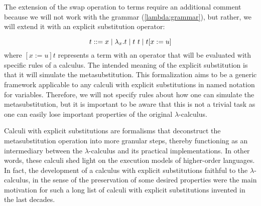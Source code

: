  The extension of the swap operation to terms require an additional comment because we will not work with the grammar (\ref{lambda:grammar}), but rather, we will extend it with an explicit substitution operator:


\begin{equation}\label{es:grammar}
  t ::= x \mid \lambda_x.t \mid t\ t \mid t [ x := u ]
\end{equation}
\noindent where $[x := u] t$ represents a term with an operator that will be evaluated with specific rules of a calculus. The intended meaning of the explicit substitution is that it will simulate the metasubstitution. This formalization aims to be a generic framework applicable to any calculi with explicit substitutions in named notation for variables. Therefore, we will not specify rules about how one can simulate the metasubstitution, but it is important to be aware that this is not a trivial task as one can easily lose important properties of the original $\lambda$-calculus\cite{melliesTypedLcalculiExplicit1995,guillaumeLambdaCalculusDoes2000}.


Calculi with explicit substitutions are formalisms that deconstruct the metasubstitution operation into more granular steps, thereby functioning as an intermediary between the $\lambda$-calculus and its practical implementations. In other words, these calculi shed light on the execution models of higher-order languages. In fact, the development of a calculus with explicit substitutions faithful to the $\lambda$-calculus, in the sense of the preservation of some desired properties were the main motivation for such a long list of calculi with explicit substitutions invented in the last decades\cite{abadiExplicitSubstitutions1991,blooPreservationStrongNormalisation1995,benaissaLambdaUpsilonCalculus1996,curienConfluencePropertiesWeak1996,munozConfluencePreservationStrong1996,kamareddineExtendingLambdaCalculusExplicit1997,blooExplicitSubstitutionEdge1999,davidLambdacalculusExplicitWeakening2001,kesnerTheoryExplicitSubstitutions2009}.



